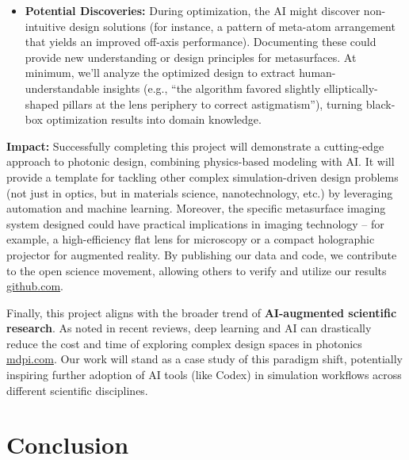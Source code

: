 \documentclass[11pt]{article}
\begin{document}
\begin{itemize}
  \item \textbf{Potential Discoveries:} During optimization, the AI might discover non-intuitive design solutions (for instance, a pattern of meta-atom arrangement that yields an improved off-axis performance). Documenting these could provide new understanding or design principles for metasurfaces. At minimum, we'll analyze the optimized design to extract human-understandable insights (e.g., ``the algorithm favored slightly elliptically-shaped pillars at the lens periphery to correct astigmatism''), turning black-box optimization results into domain knowledge.
\end{itemize}

\noindent\textbf{Impact:} Successfully completing this project will demonstrate a cutting-edge approach to photonic design, combining physics-based modeling with AI. It will provide a template for tackling other complex simulation-driven design problems (not just in optics, but in materials science, nanotechnology, etc.) by leveraging automation and machine learning. Moreover, the specific metasurface imaging system designed could have practical implications in imaging technology -- for example, a high-efficiency flat lens for microscopy or a compact holographic projector for augmented reality. By publishing our data and code, we contribute to the open science movement, allowing others to verify and utilize our results\,\href{https://github.com/hzzg0727/Metasurface-Design#:~:text=A%20major%20advantage%20of%20the,flexible%2C%20convenient%2C%20and%20automated%20workflow}{github.com}.

Finally, this project aligns with the broader trend of \textbf{AI-augmented scientific research}. As noted in recent reviews, deep learning and AI can drastically reduce the cost and time of exploring complex design spaces in photonics\,\href{https://www.mdpi.com/2304-6732/12/10/947#:~:text=Recently%2C%20the%20application%20of%20deep,429%2C353%20%2C%20431%2C355%20%2C%20433%2C357}{mdpi.com}. Our work will stand as a case study of this paradigm shift, potentially inspiring further adoption of AI tools (like Codex) in simulation workflows across different scientific disciplines.

\section{Conclusion}
\end{document}
